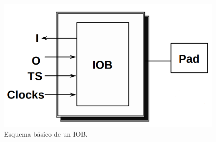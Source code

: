 \documentclass[twoside,spanish,ESP,MSc]{plantillaLabUPV}
\theoremstyle{definition}
\newcommand{\f}{FPGA }
\begin{document}




\begin{figure}[h]
\centering
\includegraphics[scale=0.3]{ima/iob.png}
\caption{Esquema básico de un IOB. %
\label{iob}}
\end{figure}
\end{document}
